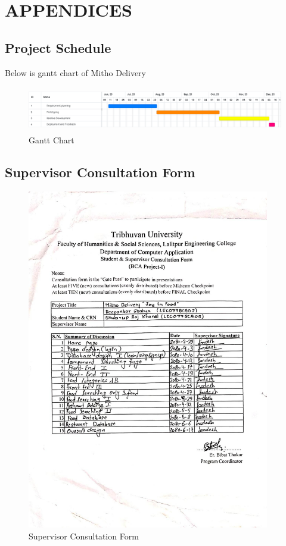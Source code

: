\chapter{APPENDICES}
\section{Project Schedule}
Below is gantt chart of Mitho Delivery
\begin{figure}[H]
    \includegraphics[height=2cm]{img/Graphics/gantt.png}
    \caption{Gantt Chart}
\end{figure}


\section{Supervisor Consultation Form}
\begin{figure}[H]
    \centering
        \includegraphics[width=400px]{img/Graphics/logsheet.jpg}
    \caption{Supervisor Consultation Form}
\end{figure}